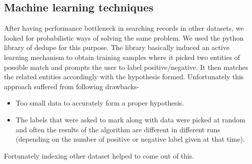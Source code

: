 \subsection{Machine learning techniques}

        After having performance bottleneck in searching records in other datasets, we looked for probabilistic ways of solving the same problem. We used the python library of dedupe \cite{dedupe} for this purpose. The library basically induced an active learning mechanism to obtain training samples where it picked two entities of possible match and prompts the user to label positive/negative. It then matches the related entities accordingly with the hypothesis formed. Unfortunately this approach suffered from following drawbacks-
        \begin{itemize}
        \item Too small data to accurately form a proper hypothesis. 
        \item The labels that were asked to mark along with data were picked at random and often the results of the algorithm are different in different runs (depending on the number of positive or negative label given at that time).
        \end{itemize}
        Fortunately indexing other dataset helped to come out of this.

